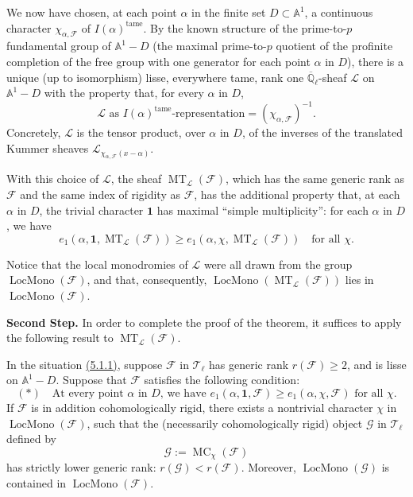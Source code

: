 We now have chosen, at each point \(\alpha\) in the finite set
\(D\subset\mathbb{A}^1\), a continuous character \(\chi_{\alpha,\mathcal{F}}\)
of \(I(\alpha)^{\mathrm{tame}}\). By the known structure of the prime-to-\(p\)
fundamental group of \(\mathbb{A}^1-D\) (the maximal prime-to-\(p\) quotient of
the profinite completion of the free group with one generator for each point
\(\alpha\) in \(D\)), there is a unique (up to isomorphism) lisse, everywhere
tame, rank one \(\overline{\mathbb{Q}}_\ell\)-sheaf \(\mathcal{L}\) on
\(\mathbb{A}^1-D\) with the property that, for every \(\alpha\) in \(D\),
\[
  \mathcal{L}\text{ as }I(\alpha)^{\mathrm{tame}}\text{-representation}
  =(\chi_{\alpha,\mathcal{F}})^{-1}.
\]
Concretely, \(\mathcal{L}\) is the tensor product, over \(\alpha\) in \(D\), of
the inverses of the translated Kummer sheaves
\(\mathcal{L}_{\chi_{\alpha,\mathcal{F}}(x-\alpha)}\).

With this choice of \(\mathcal{L}\), the sheaf
\(\operatorname{MT}_{\mathcal{L}}(\mathcal{F})\), which has the same generic
rank as \(\mathcal{F}\) and the same index of rigidity as \(\mathcal{F}\), has
the additional property that, at each \(\alpha\) in \(D\), the trivial
character \(\mathbf{1}\) has maximal ``simple multiplicity'': for each
\(\alpha\) in \(D\), we have
\[
  e_1(\alpha,\mathbf{1},\operatorname{MT}_{\mathcal{L}}(\mathcal{F}))
  \geq
  e_1(\alpha,\chi,\operatorname{MT}_{\mathcal{L}}(\mathcal{F}))
  \quad\text{for all \(\chi\)}.
\]

Notice that the local monodromies of \(\mathcal{L}\) were all drawn from the
group \(\operatorname{LocMono}(\mathcal{F})\), and that, consequently,
\(\operatorname{LocMono}(\operatorname{MT}_{\mathcal{L}}(\mathcal{F}))\) lies
in \(\operatorname{LocMono}(\mathcal{F})\).

\textbf{Second Step.} In order to complete the proof of the theorem, it
suffices to apply the following result to
\(\operatorname{MT}_{\mathcal{L}}(\mathcal{F})\).

In the situation \hyperref[par:5.1.1]{(5.1.1)}, suppose \(\mathcal{F}\) in
\(\mathcal{T}_\ell\) has generic rank \(r(\mathcal{F})\geq 2\), and is lisse
on \(\mathbb{A}^1-D\). Suppose that \(\mathcal{F}\) satisfies the following
condition:
\[
  (*)\quad
  \text{At every point \(\alpha\) in \(D\), we have }
  e_1(\alpha,\mathbf{1},\mathcal{F})\geq e_1(\alpha,\chi,\mathcal{F})
  \text{ for all \(\chi\)}.
\]
If \(\mathcal{F}\) is in addition cohomologically rigid, there exists a
nontrivial character \(\chi\) in \(\operatorname{LocMono}(\mathcal{F})\), such
that the (necessarily cohomologically rigid) object \(\mathcal{G}\) in
\(\mathcal{T}_\ell\) defined by
\[
  \mathcal{G}:=\operatorname{MC}_\chi(\mathcal{F})
\]
has strictly lower generic rank: \(r(\mathcal{G})<r(\mathcal{F})\). Moreover,
\(\operatorname{LocMono}(\mathcal{G})\) is contained in
\(\operatorname{LocMono}(\mathcal{F})\).

